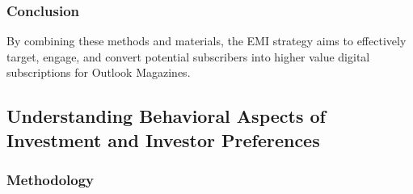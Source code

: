 \subsubsection{Conclusion}
By combining these methods and materials, the EMI strategy aims to effectively target, engage, and convert potential subscribers into higher value digital subscriptions for Outlook Magazines.

\subsection{Understanding Behavioral Aspects of Investment and Investor Preferences}

\subsubsection{Methodology}

